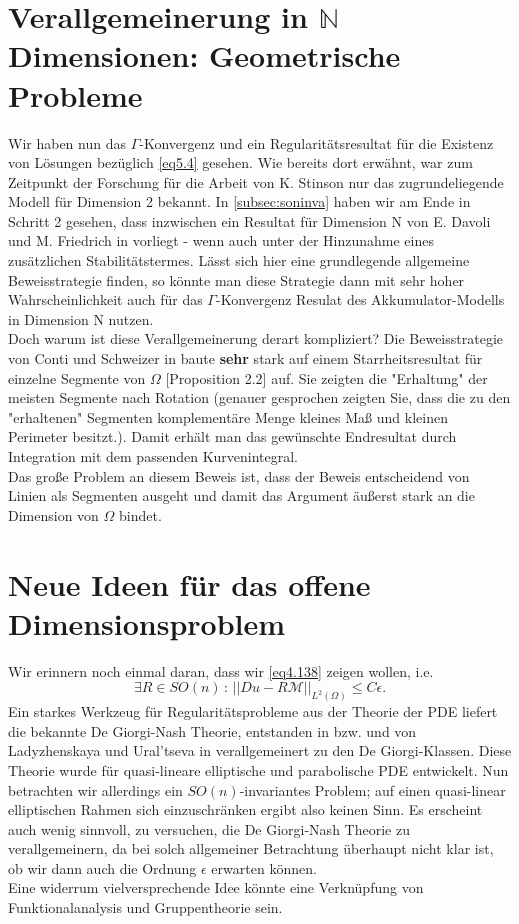 \section[Verallgemeinerung in N Dimensionen: Geometrische Probleme]{Verallgemeinerung in \(\mathbb{N}\) Dimensionen: Geometrische Probleme}{\label{sec:gendim}}
Wir haben nun das \(\Gamma\)-Konvergenz und ein Regularitätsresultat für die Existenz von Lösungen bezüglich \eqref{eq5.4} gesehen. Wie bereits dort erwähnt, war zum Zeitpunkt der Forschung für die Arbeit von K. Stinson \cite{stinson2021analysis} nur das zugrundeliegende Modell für Dimension 2 bekannt. In \ref{subsec:soninva} haben wir am Ende in Schritt 2 gesehen, dass inzwischen ein Resultat für Dimension N von E. Davoli und M. Friedrich in \cite{davoli2020two} vorliegt - wenn auch unter der Hinzunahme eines zusätzlichen Stabilitätstermes. Lässt sich hier eine grundlegende allgemeine Beweisstrategie finden, so könnte man diese Strategie dann mit sehr hoher Wahrscheinlichkeit auch für das \(\Gamma\)-Konvergenz Resulat des Akkumulator-Modells in Dimension N nutzen.\\
Doch warum ist diese Verallgemeinerung derart kompliziert? Die Beweisstrategie von Conti und Schweizer in \cite{ContiSchweizerSolidSolid} baute \textbf{sehr} stark auf einem Starrheitsresultat für einzelne Segmente von \(\Omega\) \cite{ContiSchweizerSolidSolid}[Proposition 2.2] auf. Sie zeigten die "Erhaltung" der meisten Segmente nach Rotation (genauer gesprochen zeigten Sie, dass die zu den "erhaltenen" Segmenten komplementäre Menge kleines Maß und kleinen Perimeter besitzt.). Damit erhält man das gewünschte Endresultat durch Integration mit dem passenden Kurvenintegral.\\
Das große Problem an diesem Beweis ist, dass der Beweis entscheidend von Linien als Segmenten ausgeht und damit das Argument äußerst stark an die Dimension von \(\Omega\) bindet.\\
\section{Neue Ideen für das offene Dimensionsproblem}{\label{sec:newidea}}
Wir erinnern noch einmal daran, dass wir \eqref{eq4.138} zeigen wollen, i.e.
\begin{equation}
    \exists R \in SO(n) \, : \, ||Du - R \mathcal{M}||_{L^2(\Omega)} \leq C \epsilon.
\end{equation}
Ein starkes Werkzeug für Regularitätsprobleme aus der Theorie der PDE liefert die bekannte De Giorgi-Nash Theorie, entstanden in \cite{de1957sulla} bzw. \cite{nash1958continuity} und von Ladyzhenskaya und Ural'tseva in \cite{ladyzhenskaya1968linear} verallgemeinert zu den De Giorgi-Klassen. Diese Theorie wurde für quasi-lineare elliptische und parabolische PDE entwickelt. Nun betrachten wir allerdings ein \(SO(n)\)-invariantes Problem; auf einen quasi-linear elliptischen Rahmen sich einzuschränken ergibt also keinen Sinn. Es erscheint auch wenig sinnvoll, zu versuchen, die De Giorgi-Nash Theorie zu verallgemeinern, da bei solch allgemeiner Betrachtung überhaupt nicht klar ist, ob wir dann auch die Ordnung \(\epsilon\) erwarten können.\\
Eine widerrum vielversprechende Idee könnte eine Verknüpfung von Funktionalanalysis und Gruppentheorie sein. 